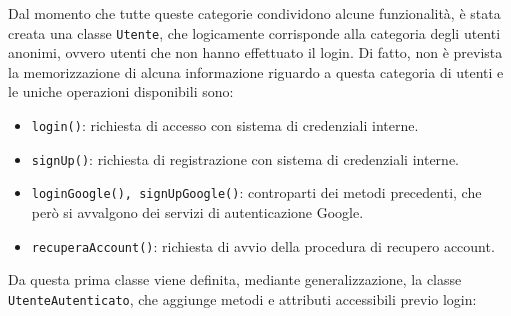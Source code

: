 \documentclass[11pt, a4paper]{article}
\theoremstyle{definition} %
\begin{document}
Dal momento che tutte queste categorie condividono alcune funzionalità, è stata
creata una classe \texttt{Utente}, che logicamente corrisponde alla categoria
degli utenti anonimi, ovvero utenti che non hanno effettuato il login. Di fatto,
non è prevista la memorizzazione di alcuna informazione riguardo a questa categoria
di utenti e le uniche operazioni disponibili sono:
\begin{itemize}
    \item \texttt{login()}: richiesta di accesso con sistema di credenziali interne.
    \item \texttt{signUp()}: richiesta di registrazione con sistema di credenziali interne.
    \item \texttt{loginGoogle(), signUpGoogle()}: controparti dei metodi precedenti, che
    però si avvalgono dei servizi di autenticazione Google.

    \item \texttt{recuperaAccount()}: richiesta di avvio della procedura di recupero account.
\end{itemize}
Da questa prima classe viene definita, mediante generalizzazione, la classe
\texttt{UtenteAutenticato}, che aggiunge metodi e attributi accessibili previo
login:
\end{document}
